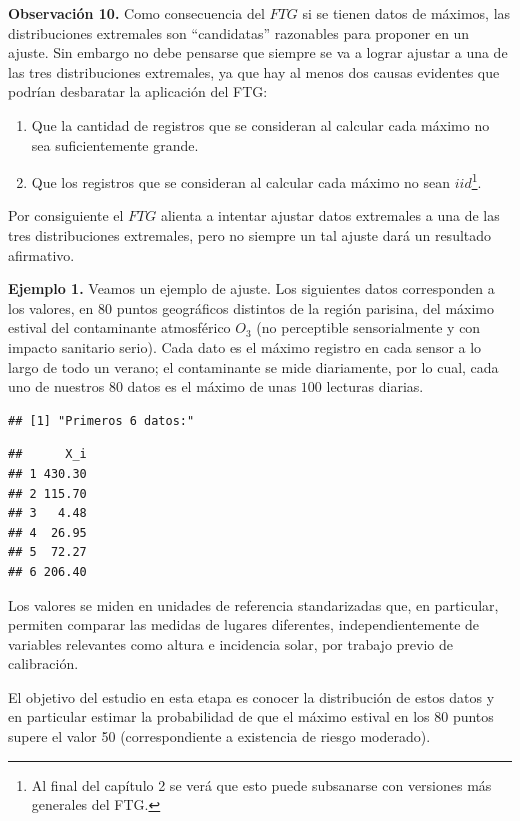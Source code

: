 \documentclass[
  20pt,
]{book}
\theoremstyle{definition}
\theoremstyle{definition}
\theoremstyle{definition}
\theoremstyle{definition}
\theoremstyle{remark}
\begin{document}
\textbf{Observación 10.} Como consecuencia del \(FTG\) si se tienen datos de máximos, las distribuciones extremales son ``candidatas'' razonables para proponer en un ajuste.
Sin embargo no debe pensarse que siempre se va a lograr ajustar a una de las tres distribuciones extremales, ya que hay al menos dos causas evidentes que podrían desbaratar la aplicación del FTG:

\begin{enumerate}
\def\labelenumi{\arabic{enumi})}
\item
  Que la cantidad de registros que se consideran al
  calcular cada máximo no sea suficientemente
  grande.
\item
  Que los registros que se consideran al calcular cada máximo no sean \(iid\)\footnote{Al final del capítulo 2 se verá que esto puede subsanarse con versiones más generales del FTG.}.
\end{enumerate}

Por consiguiente el \(FTG\) alienta a intentar ajustar datos
extremales a una de las tres distribuciones extremales, pero no
siempre un tal ajuste dará un resultado afirmativo.

\textbf{Ejemplo 1.} Veamos un ejemplo de ajuste. Los
siguientes datos corresponden a los valores, en \(80\) puntos geográficos distintos de la región parisina, del máximo estival del contaminante atmosférico \(O_3\) (no perceptible sensorialmente y con impacto
sanitario serio). Cada dato es el máximo registro en cada sensor a lo largo de todo un verano; el contaminante se mide diariamente, por lo cual, cada uno de nuestros \(80\) datos es el máximo de unas \(100\) lecturas diarias.

\begin{verbatim}
## [1] "Primeros 6 datos:"
\end{verbatim}

\begin{verbatim}
##      X_i
## 1 430.30
## 2 115.70
## 3   4.48
## 4  26.95
## 5  72.27
## 6 206.40
\end{verbatim}

Los valores se miden en unidades de referencia
standarizadas que, en particular, permiten
comparar las medidas de lugares diferentes,
independientemente de variables relevantes como
altura e incidencia solar, por trabajo previo de
calibración.

El objetivo del estudio en esta etapa es conocer la
distribución de estos datos y en particular estimar
la probabilidad de que el máximo estival en los 80
puntos supere el valor 50 (correspondiente a
existencia de riesgo moderado).
\end{document}
